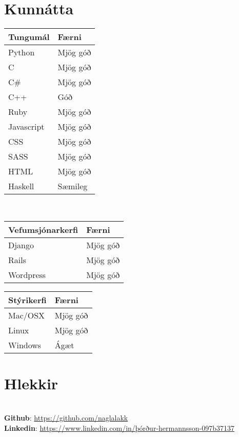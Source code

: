 \documentclass{cv_styles}
\begin{document}
\section{Kunnátta}
\begin{tabularx}{\textwidth}{X|l}
    \textbf{Tungumál} & \textbf{Færni} \\
\hline
Python & Mjög góð \\
C & Mjög góð \\
C\# & Mjög góð \\
C++  & Góð \\
Ruby & Mjög góð \\
Javascript & Mjög góð \\
CSS & Mjög góð \\
SASS & Mjög góð \\
HTML & Mjög góð \\
Haskell & Sæmileg \\
\end{tabularx} \\
\bigbreak
\noindent
\begin{tabularx}{\textwidth}{X|l}
    \textbf{Vefumsjónarkerfi} & \textbf{Færni} \\
\hline
Django & Mjög góð \\
Rails & Mjög góð \\
Wordpress & Mjög góð
\end{tabularx}
\bigbreak
\noindent
\begin{tabularx}{\textwidth}{X|l}
    \textbf{Stýrikerfi} & \textbf{Færni} \\
\hline
Mac/OSX & Mjög góð \\
Linux & Mjög góð \\
Windows & Ágæt \\
\end{tabularx}
\bigbreak
\noindent
\section{Hlekkir}
\\
\textbf{Github}: \href{https://github.com/naglalakk}{https://github.com/naglalakk}\\
\textbf{Linkedin}: \href{https://www.linkedin.com/in/%C3%BE%C3%B3r%C3%B0ur-hermannsson-097b37137/}{https://www.linkedin.com/in/þórður-hermannsson-097b37137}
\end{document}
